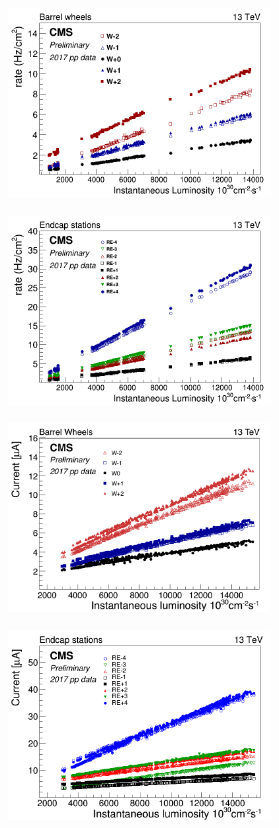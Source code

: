 	\begin{figure}[H]
		\begin{subfigure}{0.5\linewidth}
			\centering
			\includegraphics[height=5cm]{fig/chapt5/Rate-vs-Lumi-Barrel.png}
			\caption{\label{fig:Rate-I-vs-Lumi:A}}
		\end{subfigure}
		\begin{subfigure}{0.5\linewidth}
			\centering
			\includegraphics[height=5cm]{fig/chapt5/Rate-vs-Lumi-Endcap.png}
			\caption{\label{fig:Rate-I-vs-Lumi:B}}
		\end{subfigure}
		\begin{subfigure}{0.5\linewidth}
			\centering
			\includegraphics[height=5cm]{fig/chapt5/Current-vs-Lumi-Barrel.png}
			\caption{\label{fig:Rate-I-vs-Lumi:C}}
		\end{subfigure}
		\begin{subfigure}{0.5\linewidth}
			\centering
			\includegraphics[height=5cm]{fig/chapt5/Current-vs-Lumi-Endcap.png}

\end{subfigure}
\end{figure}
